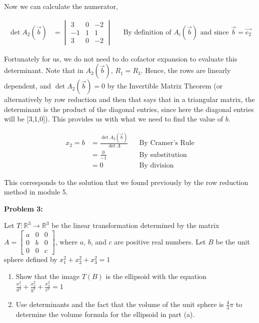 \documentclass[10pt,letterpaper,final]{report}
\newcommand{\reason}[1]{&& \text{#1}}
\begin{document}
\noindent Now we can calculate the numerator,

\begin{align*}
  \det A_2(\vec{b}) & = \begin{vmatrix}
                          3  & 0 & -2 \\
                          -1 & 1 & 1  \\
                          3  & 0 & -2
                        \end{vmatrix} \reason{By definition of $A_{i}(\vec{b})$ and since $\vec{b} = \vec{e_2}$}
\end{align*}

Fortunately for us, we do not need to do cofactor expansion to evaluate this determinant. Note that in $A_2(\vec{b})$, $R_1 = R_3$. Hence, the rows are linearly dependent, and $\det A_2(\vec{b}) = 0$ by the Invertible Matrix Theorem (or alternatively by row reduction and then \cite[Theorem 3.2, p.~175]{LayEtAl2020LinearAlgebraAndItsApplications} that says that in a triangular matrix, the determinant is the product of the diagonal entries, since here the diagonal entries will be [3,1,0]). This provides us with what we need to find the value of $b$.

\begin{align*}
  x_2 = b & = \frac{\det A_2(\vec{b})}{\det A} \reason{By Cramer's Rule} \\[1ex]
          & = \frac{0}{-1} \reason{By substitution}                      \\
          & = 0 \reason{By division}
\end{align*}

This corresponds to the solution that we found previously by the row reduction method in module 5.

\pagebreak
\noindent\textbf{Problem 3:}
\medskip

Let $T: \mathbb{R}^3 \to \mathbb{R}^3$ be the linear transformation determined by the matrix $A = \begin{bmatrix}
    a & 0 & 0 \\
    0 & b & 0 \\
    0 & 0 & c
  \end{bmatrix}$, where $a$, $b$, and $c$ are positive real numbers. Let $B$ be the unit sphere defined by $x^{2}_{1} + x^{2}_{2} + x^{2}_{3} = 1$

\begin{enumerate}[label=(\alph*)]
  \item Show that the image $T(B)$ is the ellipsoid with the equation $\frac{x^{2}_{1}}{a^2} + \frac{x^{2}_{2}}{b^2} + \frac{x^{2}_{3}}{c^2} = 1$
  \item Use determinants and the fact that the volume of the unit sphere is $\frac{4}{3}\pi$ to determine the volume formula for the ellipsoid in part (a).
\end{enumerate}
\end{document}

